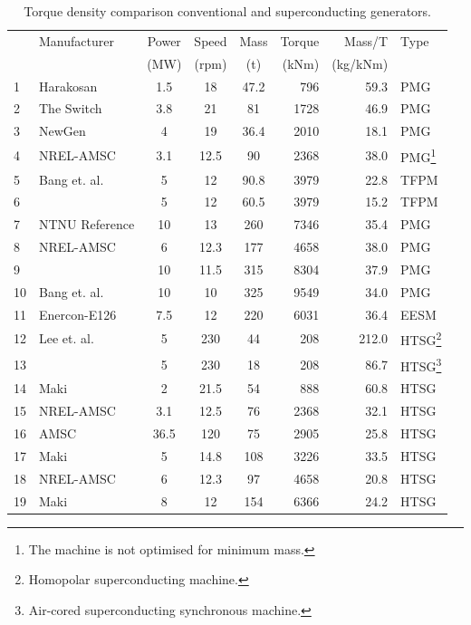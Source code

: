 \documentclass[12pt]{iopart}
\begin{document}
\begin{table}[]
\begin{minipage}{\textwidth}
\caption{Torque density comparison conventional and superconducting generators.}
\label{generators_list}
\centering
\begin{tabular}{llcccrrl}
\hline
 & Manufacturer & Power & Speed & Mass & Torque & Mass/T & Type \\
&  & (MW) & (rpm) & (t) & (kNm) & (kg/kNm) & \\
\hline
1 & Harakosan \cite{Duan2009}& 1.5 & 18 & 47.2 & 796 & 59.3 & PMG \\
2 & The Switch \cite{Duan2009} & 3.8 & 21 & 81 & 1728 & 46.9 & PMG  \\
3 & NewGen \cite{Engstrom2004} & 4 & 19 & 36.4 & 2010 & 18.1 & PMG  \\
4 & NREL-AMSC \cite{Maples2010}& 3.1 & 12.5 & 90 & 2368 & 38.0 & PMG\footnote{The machine is not optimised for minimum mass.}  \\ 
5 & Bang et. al. \cite{Bang2009} & 5 & 12 & 90.8 & 3979 & 22.8 & TFPM  \\
6 &  & 5 & 12 & 60.5 & 3979 & 15.2 & TFPM \\
7 & NTNU Reference \cite{Smith2012} & 10 & 13 & 260 & 7346 & 35.4 & PMG \\
8 & NREL-AMSC \cite{Maples2010} & 6 & 12.3 & 177 & 4658 & 38.0 &  PMG \\
9 &  & 10 & 11.5 & 315 & 8304 & 37.9 & PMG  \\
10 & Bang et. al. \cite{Bang2008} & 10 & 10 & 325 & 9549 & 34.0 & PMG  \\
11 & Enercon-E126 & 7.5 & 12 & 220 & 6031 & 36.4 & EESM \\
12 & Lee et. al. \cite{Lee2008} & 5 & 230 & 44 & 208 & 212.0 & HTSG\footnote{Homopolar superconducting machine.}  \\
13 &  & 5 & 230 & 18 & 208 & 86.7 &  HTSG\footnote{Air-cored superconducting synchronous machine.} \\
14 &  Maki \cite{Maki2008} & 2 & 21.5 & 54 & 888 & 60.8 & HTSG  \\
15 & NREL-AMSC \cite{Maples2010} & 3.1 & 12.5 & 76 & 2368 & 32.1 & HTSG  \\
16 & AMSC \cite{Kalsi2006} & 36.5 & 120 & 75 & 2905 & 25.8 & HTSG \\
17 & Maki \cite{Maki2008} & 5 & 14.8 & 108 & 3226 & 33.5 & HTSG \\
18 & NREL-AMSC \cite{Maples2010}  & 6 & 12.3 & 97 & 4658 & 20.8 & HTSG  \\
19 & Maki \cite{Maki2008}  & 8 & 12 & 154 & 6366 & 24.2 & HTSG  \\

\end{tabular}
\end{minipage}
\end{table}
\end{document}
